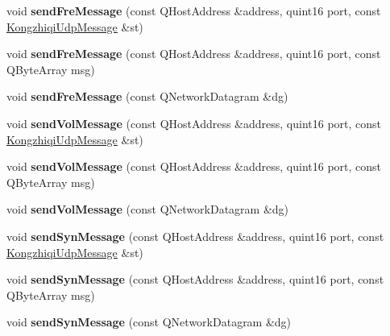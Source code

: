 \begin{DoxyCompactItemize}
void {\bfseries send\+Fre\+Message} (const Q\+Host\+Address \&address, quint16 port, const \mbox{\hyperlink{class_kongzhiqi_udp_message}{Kongzhiqi\+Udp\+Message}} \&st)
\item 
\mbox{\label{class_kongzhiqi_udp_protocol_a59072d25ad4361c76fb90b2c6fb6e09c}} 
void {\bfseries send\+Fre\+Message} (const Q\+Host\+Address \&address, quint16 port, const Q\+Byte\+Array msg)
\item 
\mbox{\label{class_kongzhiqi_udp_protocol_aeed516fb7f54b9abdaed08086433981e}} 
void {\bfseries send\+Fre\+Message} (const Q\+Network\+Datagram \&dg)
\item 
\mbox{\label{class_kongzhiqi_udp_protocol_add364dee0790d27971bf5c774f984bf4}} 
void {\bfseries send\+Vol\+Message} (const Q\+Host\+Address \&address, quint16 port, const \mbox{\hyperlink{class_kongzhiqi_udp_message}{Kongzhiqi\+Udp\+Message}} \&st)
\item 
\mbox{\label{class_kongzhiqi_udp_protocol_ab9621e00b0bb7eac5a47d404de1a0f60}} 
void {\bfseries send\+Vol\+Message} (const Q\+Host\+Address \&address, quint16 port, const Q\+Byte\+Array msg)
\item 
\mbox{\label{class_kongzhiqi_udp_protocol_a40216e836d47d58d8f12e5b5cfe103e7}} 
void {\bfseries send\+Vol\+Message} (const Q\+Network\+Datagram \&dg)
\item 
\mbox{\label{class_kongzhiqi_udp_protocol_a9a644faa3a2ff9875d01eddb1e4b2330}} 
void {\bfseries send\+Syn\+Message} (const Q\+Host\+Address \&address, quint16 port, const \mbox{\hyperlink{class_kongzhiqi_udp_message}{Kongzhiqi\+Udp\+Message}} \&st)
\item 
\mbox{\label{class_kongzhiqi_udp_protocol_abb292b29af5149c05506085496eaa410}} 
void {\bfseries send\+Syn\+Message} (const Q\+Host\+Address \&address, quint16 port, const Q\+Byte\+Array msg)
\item 
\mbox{\label{class_kongzhiqi_udp_protocol_aa90fee21c39c13cb7e79046f4ff41a2a}} 
void {\bfseries send\+Syn\+Message} (const Q\+Network\+Datagram \&dg)

\end{DoxyCompactItemize}
